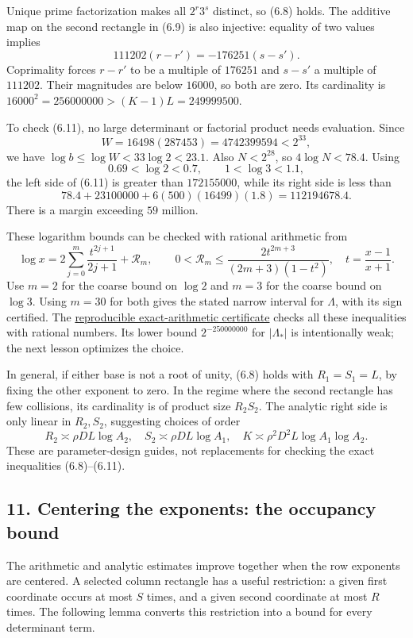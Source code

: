 \documentclass[
  11pt,
  a4paper,
]{article}
\begin{document}
Unique prime factorization makes all \(2^r3^s\) distinct, so (6.8)
holds. The additive map on the second rectangle in (6.9) is also
injective: equality of two values implies \[
111202(r-r')=-176251(s-s').
\] Coprimality forces \(r-r'\) to be a multiple of \(176251\) and
\(s-s'\) a multiple of \(111202\). Their magnitudes are below \(16000\),
so both are zero. Its cardinality is
\(16000^2=256000000>(K-1)L=249999500\).

To check (6.11), no large determinant or factorial product needs
evaluation. Since \[
W=16498(287453)=4742399594<2^{33},
\] we have \(\log b\le\log W<33\log2<23.1\). Also \(N<2^{28}\), so
\(4\log N<78.4\). Using \[
0.69<\log2<0.7,\qquad 1<\log3<1.1,
\] the left side of (6.11) is greater than \(172155000\), while its
right side is less than \[
78.4+23100000+6(500)(16499)(1.8)
=112194678.4.
\] There is a margin exceeding \(59\) million.

These logarithm bounds can be checked with rational arithmetic from \[
\log x=2\sum_{j=0}^{m}\frac{t^{2j+1}}{2j+1}
+\mathcal R_m,\qquad
0<\mathcal R_m\le\frac{2t^{2m+3}}{(2m+3)(1-t^2)},
\quad t=\frac{x-1}{x+1}.
\] Use \(m=2\) for the coarse bound on \(\log2\) and \(m=3\) for the
coarse bound on \(\log3\). Using \(m=30\) for both gives the stated
narrow interval for \(\Lambda\), with its sign certified. The
\href{https://kokunoyumeto.github.io/open-math-courses-public/courses/TR-BAKER/verification/two_logarithm_parameters.py}{reproducible
exact-arithmetic certificate} checks all these inequalities with
rational numbers. Its lower bound \(2^{-250000000}\) for \(|\Lambda_*|\)
is intentionally weak; the next lesson optimizes the choice.

In general, if either base is not a root of unity, (6.8) holds with
\(R_1=S_1=L\), by fixing the other exponent to zero. In the regime where
the second rectangle has few collisions, its cardinality is of product
size \(R_2S_2\). The analytic right side is only linear in \(R_2,S_2\),
suggesting choices of order \[
R_2\asymp\rho DL\log A_2,\quad
S_2\asymp\rho DL\log A_1,\quad
K\asymp\rho^2D^2L\log A_1\log A_2.
\] These are parameter-design guides, not replacements for checking the
exact inequalities (6.8)--(6.11).

\subsection{11. Centering the exponents: the occupancy
bound}\label{centering-the-exponents-the-occupancy-bound}

The arithmetic and analytic estimates improve together when the row
exponents are centered. A selected column rectangle has a useful
restriction: a given first coordinate occurs at most \(S\) times, and a
given second coordinate at most \(R\) times. The following lemma
converts this restriction into a bound for every determinant term.
\end{document}
